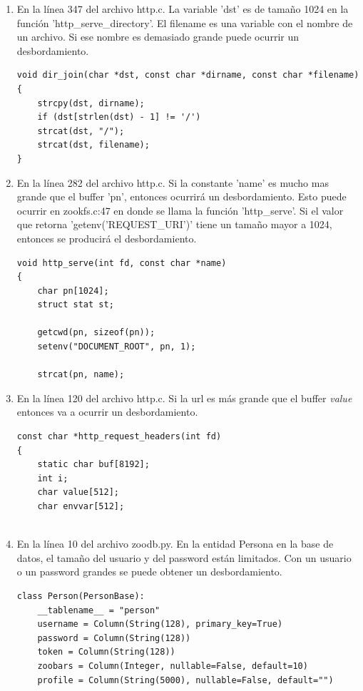 \documentclass[a4paper,12pt]{article}
\begin{document}
\begin{enumerate}
 \item En la línea 347 del archivo http.c. La variable 'dst' es de tamaño 1024 en la función 'http\_serve\_directory'. El
filename es una variable con el nombre de un archivo. Si ese nombre
es demasiado grande puede ocurrir un desbordamiento.
\begin{lstlisting}
void dir_join(char *dst, const char *dirname, const char *filename) {
    strcpy(dst, dirname);
    if (dst[strlen(dst) - 1] != '/')
	strcat(dst, "/");
    strcat(dst, filename);
}
\end{lstlisting}

\item En la línea 282 del archivo http.c. Si la constante 'name' es mucho mas grande que el buffer 'pn', entonces ocurrirá
un desbordamiento. Esto puede ocurrir en zookfs.c:47 en donde se llama la función
'http\_serve'. Si el valor que retorna 'getenv('REQUEST\_URI')' tiene un tamaño mayor a
1024, entonces se producirá el desbordamiento.
\begin{lstlisting}
void http_serve(int fd, const char *name)
{
    char pn[1024];
    struct stat st;

    getcwd(pn, sizeof(pn));
    setenv("DOCUMENT_ROOT", pn, 1);

    strcat(pn, name);
\end{lstlisting}

\item En la línea 120 del archivo http.c. Si la url es más grande que el buffer \textit{value} entonces va a ocurrir
un desbordamiento.
\begin{lstlisting}
const char *http_request_headers(int fd)
{
    static char buf[8192];      
    int i;
    char value[512];
    char envvar[512];
    
\end{lstlisting}

\item En la línea 10 del archivo zoodb.py. En la entidad Persona en la base de datos, el tamaño del usuario y del password están limitados.
Con un usuario o un password grandes se puede obtener un desbordamiento.
\begin{lstlisting}
class Person(PersonBase):
    __tablename__ = "person"
    username = Column(String(128), primary_key=True)
    password = Column(String(128))
    token = Column(String(128))
    zoobars = Column(Integer, nullable=False, default=10)
    profile = Column(String(5000), nullable=False, default="")
\end{lstlisting}


\end{enumerate}
\end{document}
